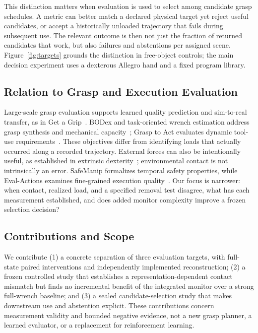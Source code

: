 \documentclass[conference,10pt,letterpaper]{IEEEtran}
\begin{document}
This distinction matters when evaluation is used to select among candidate
grasp schedules. A metric can better match a declared physical target yet
reject useful candidates, or accept a historically unloaded trajectory that
fails during subsequent use. The relevant outcome is then not just the
fraction of returned candidates that work, but also failures and abstentions
per assigned scene. Figure~\ref{fig:targets} grounds the distinction in
free-object controls; the main decision experiment uses a dexterous Allegro
hand and a fixed program library.

\subsection{Relation to Grasp and Execution Evaluation}
Large-scale grasp evaluation supports learned quality prediction and
sim-to-real transfer, as in Get a Grip~\cite{lum2025getagrip}. BODex and
task-oriented wrench estimation address grasp synthesis and mechanical
capacity~\cite{chen2025bodex,chen2023task}; Grasp to Act evaluates dynamic
tool-use requirements~\cite{grasp_to_act2026}. These objectives differ from
identifying loads that actually occurred along a recorded trajectory.
External forces can also be intentionally useful, as established in extrinsic
dexterity~\cite{extrinsic2014}; environmental contact is not intrinsically
an error. SafeManip formalizes temporal safety properties, while Eval-Actions
examines fine-grained execution quality~\cite{huang2026safemanip,eval_actions2026}.
Our focus is narrower: when contact, realized load, and a specified removal
test disagree, what has each measurement established, and does added monitor
complexity improve a frozen selection decision?

\subsection{Contributions and Scope}
We contribute (1) a concrete separation of three evaluation targets, with
full-state paired interventions and independently implemented reconstruction;
(2) a frozen controlled study that establishes a representation-dependent
contact mismatch but finds no incremental benefit of the integrated monitor
over a strong full-wrench baseline; and (3) a sealed candidate-selection study
that makes downstream use and abstention explicit. These contributions concern
measurement validity and bounded negative evidence, not a new grasp planner,
a learned evaluator, or a replacement for reinforcement learning.
\end{document}
